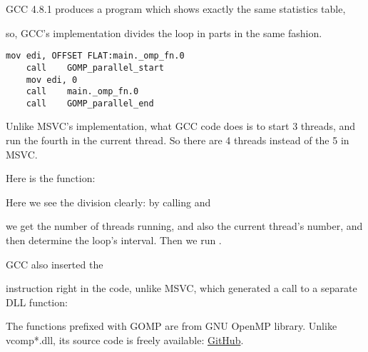 GCC 4.8.1 
produces a program which shows exactly the same statistics table, 

so, GCC's implementation divides the loop in parts in the same fashion.

\begin{lstlisting}[caption=GCC 4.8.1]
	mov	edi, OFFSET FLAT:main._omp_fn.0
	call	GOMP_parallel_start
	mov	edi, 0
	call	main._omp_fn.0
	call	GOMP_parallel_end
\end{lstlisting}

Unlike MSVC's implementation, what GCC code does is to start 3 threads,
and run the fourth in the current thread. So there are 4 threads instead of the 5 in MSVC.

Here is the  function:
 


Here we see the division clearly: by calling 
 and 

we get the number of threads running, and also the current thread's number, and then determine the loop's interval.
Then we run .

GCC also inserted the  

instruction right in the code, unlike MSVC, which generated a call to a separate DLL function:



The functions prefixed with GOMP are from GNU OpenMP library.
Unlike vcomp*.dll, its source code is freely available: 
\href{http://go.yurichev.com/17102}{GitHub}.

